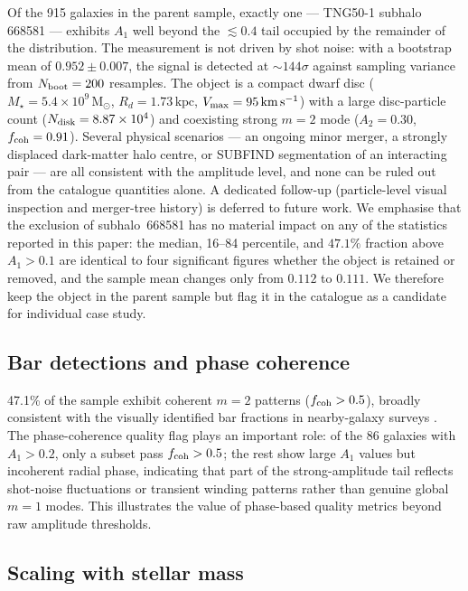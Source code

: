 \documentclass[fleqn,usenatbib]{mnras}
\newcommand{\Am}[1]{A_{#1}}
\newcommand{\Msun}{\mathrm{M}_{\odot}}
\newcommand{\kpc}{\,\mathrm{kpc}}
\newcommand{\kms}{\,\mathrm{km\,s^{-1}}}
\newcommand{\Amone}{\ensuremath{\Am{1}}}
\newcommand{\Amtwo}{\ensuremath{\Am{2}}}
\begin{document}
Of the 915 galaxies in the parent sample, exactly one --- TNG50-1
subhalo 668581 --- exhibits $\Amone$ well beyond the $\lesssim 0.4$
tail occupied by the remainder of the distribution.  The measurement
is not driven by shot noise: with a bootstrap mean of
$0.952 \pm 0.007$, the signal is detected at $\sim\!144\sigma$
against sampling variance from $N_{\rm boot} = 200$ resamples.  The
object is a compact dwarf disc
($M_\star = 5.4\times10^{9}\,\Msun$, $R_d = 1.73\kpc$,
$V_{\rm max} = 95\kms$) with a large disc-particle count
($N_{\rm disk} = 8.87\times10^{4}$) and coexisting strong $m=2$
mode ($\Amtwo = 0.30$, $f_{\rm coh} = 0.91$).  Several physical
scenarios --- an ongoing minor merger, a strongly displaced
dark-matter halo centre, or SUBFIND segmentation of an
interacting pair --- are all consistent with the amplitude
level, and none can be ruled out from the catalogue quantities
alone.  A dedicated follow-up (particle-level visual inspection
and merger-tree history) is deferred to future work.  We
emphasise that the exclusion of subhalo~668581 has no material
impact on any of the statistics reported in this paper: the
median, 16--84 percentile, and $47.1\%$ fraction above $\Amone > 0.1$
are identical to four significant figures whether the object is
retained or removed, and the sample mean changes only from $0.112$
to $0.111$.  We therefore keep the object in the parent sample but
flag it in the catalogue as a candidate for individual case study.

\subsection{Bar detections and phase coherence}
\label{sec:tng50_bardetections}

47.1\% of the sample exhibit coherent $m=2$ patterns
($f_{\rm coh} > 0.5$), broadly consistent with the visually
identified bar fractions in nearby-galaxy surveys
\citep[e.g.][]{2010PASP..122.1397S,2015ApJS..217...32B}.  The phase-coherence quality flag
plays an important role: of the 86 galaxies with $\Amone > 0.2$,
only a subset pass $f_{\rm coh} > 0.5$; the rest show large
$\Amone$ values but incoherent radial phase, indicating that
part of the strong-amplitude tail reflects shot-noise
fluctuations or transient winding patterns rather than genuine
global $m=1$ modes.  This illustrates the value of phase-based
quality metrics beyond raw amplitude thresholds.

\subsection{Scaling with stellar mass}
\end{document}
